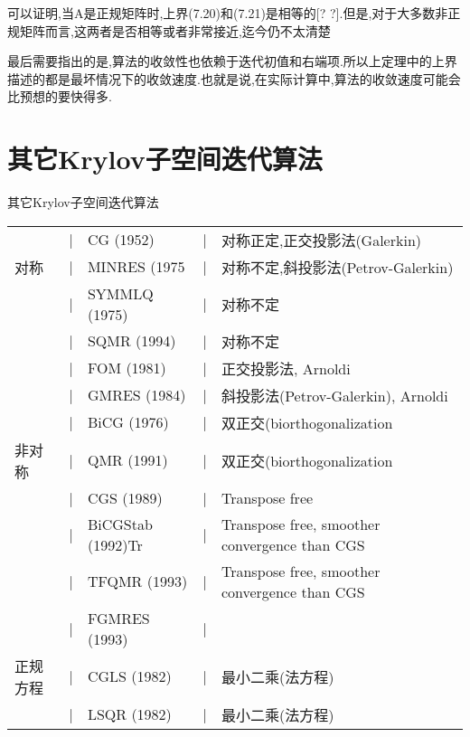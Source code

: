 \documentclass[notheorems,serif]{beamer}
\begin{document}
\begin{frame}
可以证明,当A是正规矩阵时,上界(7.20)和(7.21)是相等的[? ?].但是,对于大多数非正规矩阵而言,这两者是否相等或者非常接近,迄今仍不太清楚

最后需要指出的是,算法的收敛性也依赖于迭代初值和右端项.所以上定理中的上界描述的都是最坏情况下的收敛速度.也就是说,在实际计算中,算法的收敛速度可能会比预想的要快得多.
\end{frame}
\section{其它Krylov子空间迭代算法}
\begin{frame}
{其它Krylov子空间迭代算法}

\begin{tabular}{lllll}
	\hline
	&|&CG (1952)&|&对称正定,正交投影法(Galerkin)\\
	对称&|&MINRES (1975&|&对称不定,斜投影法(Petrov-Galerkin)\\
	&|&SYMMLQ (1975)&|&对称不定\\
	&|&SQMR (1994)&|&对称不定\\
	\hline
	&|&FOM (1981)&|&正交投影法, Arnoldi\\
	&|&GMRES (1984)&|&斜投影法(Petrov-Galerkin), Arnoldi\\
	&|&BiCG (1976)&|&双正交(biorthogonalization\\
	非对称&|&QMR (1991)&|&双正交(biorthogonalization\\
	&|&CGS (1989)&|&Transpose free\\
	&|&BiCGStab (1992)Tr&|&Transpose free, smoother convergence than CGS\\
	&|&TFQMR (1993)&|&Transpose free, smoother convergence than CGS\\
	&|&FGMRES (1993)&|&{}\\
	\hline
	正规方程&|&CGLS (1982)&|&最小二乘(法方程)\\
	&|&LSQR (1982)&|&最小二乘(法方程)\\
	\hline
\end{tabular}
\end{frame}
\end{document}
